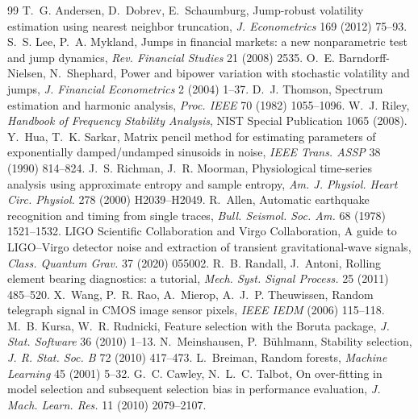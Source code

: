 \documentclass[10pt]{article}
\begin{document}
\begin{thebibliography}{99}
 T.~G. Andersen, D.~Dobrev, E.~Schaumburg, Jump-robust volatility estimation using nearest neighbor
  truncation, \emph{J. Econometrics} 169 (2012) 75--93.
 S.~S. Lee, P.~A. Mykland, Jumps in financial markets: a new nonparametric test and jump dynamics,
  \emph{Rev. Financial Studies} 21 (2008) 2535.
 O.~E. Barndorff-Nielsen, N.~Shephard, Power and bipower variation with stochastic volatility and jumps,
  \emph{J. Financial Econometrics} 2 (2004) 1--37.
 D.~J. Thomson, Spectrum estimation and harmonic analysis, \emph{Proc. IEEE} 70 (1982) 1055--1096.
 W.~J. Riley, \emph{Handbook of Frequency Stability Analysis}, NIST Special Publication 1065 (2008).
 Y.~Hua, T.~K. Sarkar, Matrix pencil method for estimating parameters of exponentially damped/undamped
  sinusoids in noise, \emph{IEEE Trans. ASSP} 38 (1990) 814--824.
 J.~S. Richman, J.~R. Moorman, Physiological time-series analysis using approximate entropy and
  sample entropy, \emph{Am. J. Physiol. Heart Circ. Physiol.} 278 (2000) H2039--H2049.
 R.~Allen, Automatic earthquake recognition and timing from single traces, \emph{Bull. Seismol. Soc.
  Am.} 68 (1978) 1521--1532.
 LIGO Scientific Collaboration and Virgo Collaboration, A guide to LIGO--Virgo detector noise and
  extraction of transient gravitational-wave signals, \emph{Class. Quantum Grav.} 37 (2020) 055002.
 R.~B. Randall, J.~Antoni, Rolling element bearing diagnostics: a tutorial, \emph{Mech. Syst. Signal
  Process.} 25 (2011) 485--520.
 X.~Wang, P.~R. Rao, A.~Mierop, A.~J.~P. Theuwissen, Random telegraph signal in CMOS image sensor
  pixels, \emph{IEEE IEDM} (2006) 115--118.
 M.~B. Kursa, W.~R. Rudnicki, Feature selection with the Boruta package, \emph{J. Stat. Software} 36
  (2010) 1--13.
 N.~Meinshausen, P.~B\"uhlmann, Stability selection, \emph{J. R. Stat. Soc. B} 72 (2010) 417--473.
 L.~Breiman, Random forests, \emph{Machine Learning} 45 (2001) 5--32.
 G.~C. Cawley, N.~L.~C. Talbot, On over-fitting in model selection and subsequent selection bias in
  performance evaluation, \emph{J. Mach. Learn. Res.} 11 (2010) 2079--2107.
\end{thebibliography}
\end{document}
